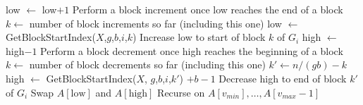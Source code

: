 \documentclass[sigplan, 10pt, nonacm]{acmart}
\theoremstyle{remark}
\theoremstyle{remark}
\begin{document}
\begin{figure*}
\begin{algorithmic}
              \State low $\gets$ low$+1$
                \Comment Perform a block increment once low reaches the end of a block
                \State $k \gets $ number of block increments so far (including this one)
                \State low $\gets$ GetBlockStartIndex($X$,$g$,$b$,$i$,$k$)
                \Comment Increase low to start of block $k$ of $G_i$
              \EndIf
            \EndWhile
              \State high $\gets$ high$-1$
                \Comment Perform a block decrement once high reaches the beginning of a block
                \State $k \gets $ number of block decrements so far (including this one)
                \State $k' \gets n/(gb) - k$
                \State high $\gets$ GetBlockStartIndex($X$, $g$,$b$,$i$,$k'$) $+b-1$
                \Comment Decrease high to end of block $k'$ of $G_i$
              \EndIf
            \EndWhile
            \State Swap $A[\text{low}]$ and $A[\text{high}]$
          \EndWhile
        \EndFor
        \State Recurse on $A[v_{min}],\ldots,A[v_{max}-1]$
      \EndIf
    \EndProcedure
	\end{algorithmic}	
\end{figure*}
\end{document}
